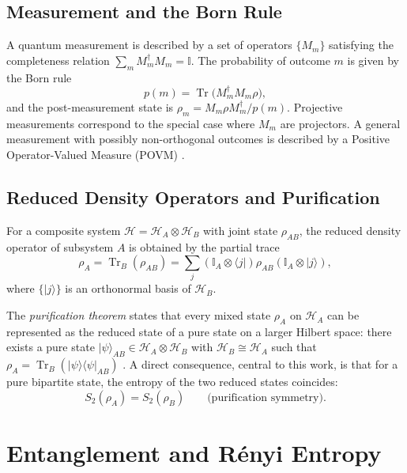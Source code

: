 \documentclass[12pt,a4paper,oneside]{book}
\theoremstyle{plain}
\theoremstyle{definition}
\theoremstyle{remark}
\begin{document}
\subsection{Measurement and the Born Rule}

A quantum measurement is described by a set of operators $\{M_m\}$ satisfying the completeness relation $\sum_m M_m^\dagger M_m = \mathbb{I}$. The probability of outcome $m$ is given by the Born rule
\begin{equation}
    p(m) = \operatorname{Tr}\bigl(M_m^\dagger M_m \rho\bigr),
\end{equation}
and the post-measurement state is $\rho_m = M_m \rho M_m^\dagger / p(m)$. Projective measurements correspond to the special case where $M_m$ are projectors. A general measurement with possibly non-orthogonal outcomes is described by a Positive Operator-Valued Measure (POVM) \cite{nielsen2010quantum}.

\subsection{Reduced Density Operators and Purification}

For a composite system $\mathcal{H} = \mathcal{H}_A \otimes \mathcal{H}_B$ with joint state $\rho_{AB}$, the reduced density operator of subsystem $A$ is obtained by the partial trace
\begin{equation}
    \rho_A = \operatorname{Tr}_B(\rho_{AB}) = \sum_j (\mathbb{I}_A \otimes \langle j|) \rho_{AB} (\mathbb{I}_A \otimes |j\rangle),
\end{equation}
where $\{|j\rangle\}$ is an orthonormal basis of $\mathcal{H}_B$.

The \emph{purification theorem} states that every mixed state $\rho_A$ on $\mathcal{H}_A$ can be represented as the reduced state of a pure state on a larger Hilbert space: there exists a pure state $|\psi\rangle_{AB} \in \mathcal{H}_A \otimes \mathcal{H}_B$ with $\mathcal{H}_B \cong \mathcal{H}_A$ such that $\rho_A = \operatorname{Tr}_B(|\psi\rangle\langle\psi|_{AB})$ \cite{nielsen2010quantum}. A direct consequence, central to this work, is that for a pure bipartite state, the entropy of the two reduced states coincides:
\begin{equation}
    S_2(\rho_A) = S_2(\rho_B) \qquad \text{(purification symmetry).}
\end{equation}

\section{Entanglement and R\'enyi Entropy}
\label{sec:renyi}
\end{document}
